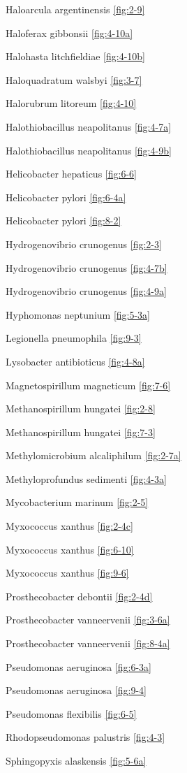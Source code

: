 \documentclass[]{tufte-book}
\begin{document}
Haloarcula argentinensis \ref{fig:2-9}

Haloferax gibbonsii \ref{fig:4-10a}

Halohasta litchfieldiae \ref{fig:4-10b}

Haloquadratum walsbyi \ref{fig:3-7}

Halorubrum litoreum \ref{fig:4-10}

Halothiobacillus neapolitanus \ref{fig:4-7a}

Halothiobacillus neapolitanus \ref{fig:4-9b}

Helicobacter hepaticus \ref{fig:6-6}

Helicobacter pylori \ref{fig:6-4a}

Helicobacter pylori \ref{fig:8-2}

Hydrogenovibrio crunogenus \ref{fig:2-3}

Hydrogenovibrio crunogenus \ref{fig:4-7b}

Hydrogenovibrio crunogenus \ref{fig:4-9a}

Hyphomonas neptunium \ref{fig:5-3a}

Legionella pneumophila \ref{fig:9-3}

Lysobacter antibioticus \ref{fig:4-8a}

Magnetospirillum magneticum \ref{fig:7-6}

Methanospirillum hungatei \ref{fig:2-8}

Methanospirillum hungatei \ref{fig:7-3}

Methylomicrobium alcaliphilum \ref{fig:2-7a}

Methyloprofundus sedimenti \ref{fig:4-3a}

Mycobacterium marinum \ref{fig:2-5}

Myxococcus xanthus \ref{fig:2-4c}

Myxococcus xanthus \ref{fig:6-10}

Myxococcus xanthus \ref{fig:9-6}

Prosthecobacter debontii \ref{fig:2-4d}

Prosthecobacter vanneervenii \ref{fig:3-6a}

Prosthecobacter vanneervenii \ref{fig:8-4a}

Pseudomonas aeruginosa \ref{fig:6-3a}

Pseudomonas aeruginosa \ref{fig:9-4}

Pseudomonas flexibilis \ref{fig:6-5}

Rhodopseudomonas palustris \ref{fig:4-3}

Sphingopyxis alaskensis \ref{fig:5-6a}
\end{document}
